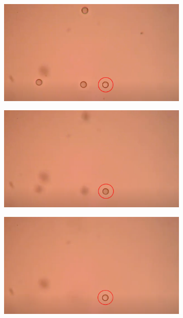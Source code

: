 \documentclass[letterpaper,12pt,oneside]{book}
\begin{document}
\begin{figure}[H]
     \centering
     \begin{subfigure}[b]{0.3\textwidth}
         \centering
         \includegraphics[width=\textwidth]{Results/jonas1redcirclenow.png}
         \caption{}
         \label{fig:y equals x}
     \end{subfigure}
     \hfill
     \begin{subfigure}[b]{0.3\textwidth}
         \centering
         \includegraphics[width=\textwidth]{Results/jonas22222222.png}
         \caption{}
         \label{fig:three sin x}
     \end{subfigure}
     \hfill
     \begin{subfigure}[b]{0.3\textwidth}
         \centering
         \includegraphics[width=\textwidth]{Results/jonas3circle.png}

\end{subfigure}
\end{figure}
\end{document}
